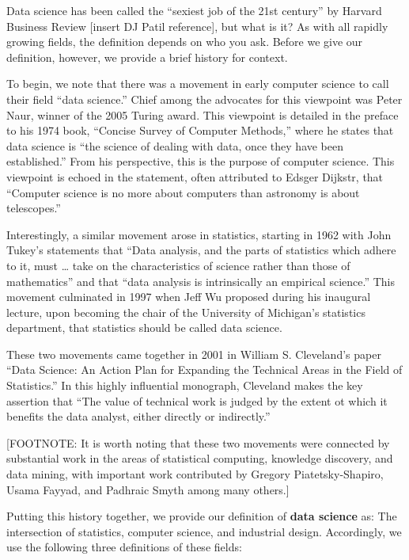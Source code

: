 \documentclass[
]{book}
\begin{document}
Data science has been called the ``sexiest job of the 21st century'' by Harvard Business Review {[}insert DJ Patil reference{]}, but what is it? As with all rapidly growing fields, the definition depends on who you ask. Before we give our definition, however, we provide a brief history for context.

To begin, we note that there was a movement in early computer science to call their field ``data science.'' Chief among the advocates for this viewpoint was Peter Naur, winner of the 2005 Turing award. This viewpoint is detailed in the preface to his 1974 book, ``Concise Survey of Computer Methods,'' where he states that data science is ``the science of dealing with data, once they have been established.'' From his perspective, this is the purpose of computer science. This viewpoint is echoed in the statement, often attributed to Edsger Dijkstr, that ``Computer science is no more about computers than astronomy is about telescopes.''

Interestingly, a similar movement arose in statistics, starting in 1962 with John Tukey's statements that ``Data analysis, and the parts of statistics which adhere to it, must \ldots{} take on the characteristics of science rather than those of mathematics'' and that ``data analysis is intrinsically an empirical science.'' This movement culminated in 1997 when Jeff Wu proposed during his inaugural lecture, upon becoming the chair of the University of Michigan's statistics department, that statistics should be called data science.

These two movements came together in 2001 in William S. Cleveland's paper ``Data Science: An Action Plan for Expanding the Technical Areas in the Field of Statistics.'' In this highly influential monograph, Cleveland makes the key assertion that ``The value of technical work is judged by the extent ot which it benefits the data analyst, either directly or indirectly.''

{[}FOOTNOTE: It is worth noting that these two movements were connected by substantial work in the areas of statistical computing, knowledge discovery, and data mining, with important work contributed by Gregory Piatetsky-Shapiro, Usama Fayyad, and Padhraic Smyth among many others.{]}

Putting this history together, we provide our definition of \textbf{data science} as: The intersection of statistics, computer science, and industrial design. Accordingly, we use the following three definitions of these fields:
\end{document}
